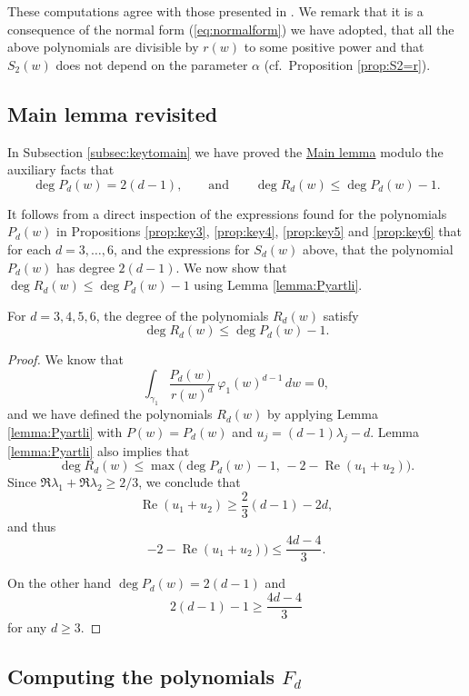 \begin{remark}
 These computations agree with those presented in \cite{Pyartli2006}. We remark that it is a consequence of the normal form (\ref{eq:normalform}) we have adopted, that all the above polynomials are divisible by $r(w)$ to some positive power and that $S_2(w)$ does not depend on the parameter $\alpha$ (cf.~Proposition \ref{prop:S2=r}).
\end{remark}


\subsection{Main lemma revisited}\label{subsec:mainlemmarevisited}

In Subsection \ref{subsec:keytomain} we have proved the \hyperref[lemma:main]{Main lemma} modulo the auxiliary facts that
\[ \deg{P_d(w)}=2(d-1), \qquad \mbox{and} \qquad \deg{R_d(w)}\leq\deg{P_d(w)}-1. \] 

It follows from a direct inspection of the expressions found for the polynomials $P_d(w)$ in Propositions \ref{prop:key3}, \ref{prop:key4}, \ref{prop:key5} and \ref{prop:key6} that for each $d=3,\ldots,6$, and the expressions for $S_d(w)$ above, that the polynomial $P_d(w)$ has degree $2(d-1)$. We now show that $\deg{R_d(w)}\leq\deg{P_d(w)}-1$ using Lemma \ref{lemma:Pyartli}.

\begin{proposition}\label{prop:degRd} 
 For $d=3,4,5,6$, the degree of the polynomials $R_d(w)$ satisfy 
\[ \deg{R_d(w)}\leq\deg{P_d(w)}-1. \]
\end{proposition}

\begin{proof}
We know that
\[ \int_{\gamma_1}\frac{P_d(w)}{r(w)^d}\,\varphi_1(w)^{d-1}\,dw = 0, \]
and we have defined the polynomials $R_d(w)$ by applying Lemma \ref{lemma:Pyartli} with $P(w)=P_d(w)$ and $u_j=(d-1)\lambda_j-d$. Lemma \ref{lemma:Pyartli} also implies that
\[ \deg{R_d}(w)\leq \max{\big(\deg{P_d}(w)-1,\,-2-\operatorname{Re}{(u_1+u_2)}\big)}. \]
Since $\Re\lambda_1+\Re\lambda_2\geq 2/3$, we conclude that 
\[ \operatorname{Re}(u_1+u_2)\geq\frac{2}{3}(d-1)-2d, \]
and thus 
\[ -2-\operatorname{Re}{(u_1+u_2)}\big)\leq\frac{4d-4}{3}. \]

On the other hand $\deg{P_d(w)}=2(d-1)$ and 
\[ 2(d-1)-1\geq\frac{4d-4}{3} \]
for any $d\geq3$.
\end{proof}


\subsection{Computing the polynomials \texorpdfstring{$F_d$}{Fd}}\label{subsec:computingFd}

